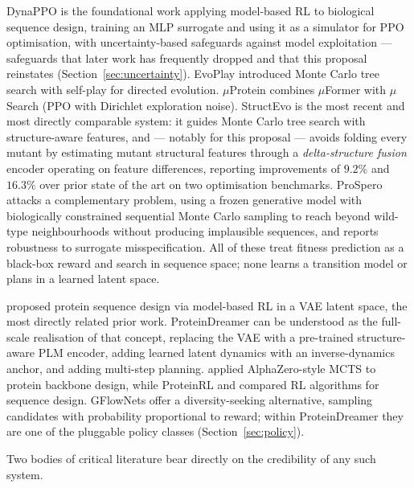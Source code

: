 \documentclass[12pt, a4paper]{article}
\begin{document}
DynaPPO \citep{angermueller2020dynappo} is the foundational work applying model-based RL to biological sequence design, training an MLP surrogate and using it as a simulator for PPO optimisation, with uncertainty-based safeguards against model exploitation --- safeguards that later work has frequently dropped and that this proposal reinstates (Section~\ref{sec:uncertainty}). EvoPlay \citep{wang2023evoplay} introduced Monte Carlo tree search with self-play for directed evolution. $\mu$Protein \citep{sun2025muprotein} combines $\mu$Former with $\mu$Search (PPO with Dirichlet exploration noise). StructEvo \citep{nie2026structevo} is the most recent and most directly comparable system: it guides Monte Carlo tree search with structure-aware features, and --- notably for this proposal --- avoids folding every mutant by estimating mutant structural features through a \textit{delta-structure fusion} encoder operating on feature differences, reporting improvements of $9.2\%$ and $16.3\%$ over prior state of the art on two optimisation benchmarks. ProSpero \citep{kmicikiewicz2025prospero} attacks a complementary problem, using a frozen generative model with biologically constrained sequential Monte Carlo sampling to reach beyond wild-type neighbourhoods without producing implausible sequences, and reports robustness to surrogate misspecification. All of these treat fitness prediction as a black-box reward and search in sequence space; none learns a transition model or plans in a learned latent space.

\citet{lee2023latentrl} proposed protein sequence design via model-based RL in a VAE latent space, the most directly related prior work. ProteinDreamer can be understood as the full-scale realisation of that concept, replacing the VAE with a pre-trained structure-aware PLM encoder, adding learned latent dynamics with an inverse-dynamics anchor, and adding multi-step planning. \citet{renard2024backbone} applied AlphaZero-style MCTS to protein backbone design, while ProteinRL \citep{sternke2023proteinrl} and \citet{subramanian2024rl_plm} compared RL algorithms for sequence design. GFlowNets \citep{jain2022gflownets} offer a diversity-seeking alternative, sampling candidates with probability proportional to reward; within ProteinDreamer they are one of the pluggable policy classes (Section~\ref{sec:policy}).

Two bodies of critical literature bear directly on the credibility of any such system.
\end{document}
